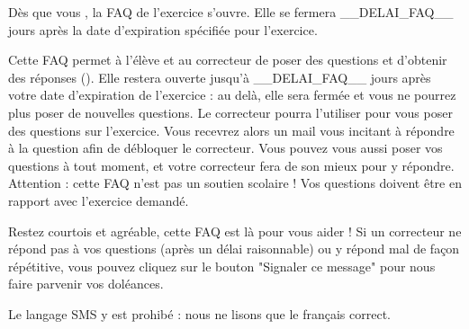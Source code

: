 ﻿Dès que vous , la FAQ de l'exercice s'ouvre. Elle se fermera __DELAI_FAQ__ jours après la date d'expiration spécifiée pour l'exercice.

Cette FAQ permet à l'élève et au correcteur de poser des questions et d'obtenir des réponses ().
Elle restera ouverte jusqu'à __DELAI_FAQ__ jours après votre date d'expiration de l'exercice : au delà, elle sera fermée et vous ne pourrez plus poser de nouvelles questions.
Le correcteur pourra l'utiliser pour vous poser des questions sur l'exercice. Vous recevrez alors un mail vous incitant à répondre à la question afin de débloquer le correcteur.
Vous pouvez vous aussi poser vos questions à tout moment, et votre correcteur fera de son mieux pour y répondre.
Attention : cette FAQ n'est pas un soutien scolaire ! Vos questions doivent être en rapport avec l'exercice demandé.

Restez courtois et agréable, cette FAQ est là pour vous aider !
Si un correcteur ne répond pas à vos questions (après un délai raisonnable) ou y répond mal de façon répétitive, vous pouvez cliquez sur le bouton "Signaler ce message" pour nous faire parvenir vos doléances.

Le langage SMS y est prohibé : nous ne lisons que le français correct.